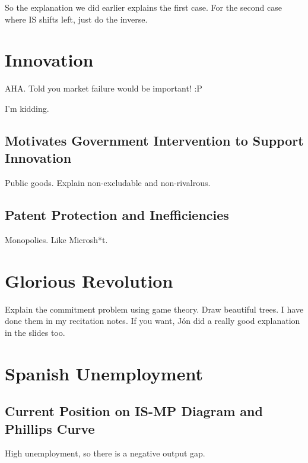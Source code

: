 \documentclass[11pt]{scrartcl}
\newcommand{\jon}{J\'{o}n }
\begin{document}
So the explanation we did earlier explains the first case. For the second case where IS shifts left, just do the inverse.

\section{Innovation}

AHA. Told you market failure would be important! :P

I'm kidding.

\subsection{Motivates Government Intervention to Support Innovation}

Public goods. Explain non-excludable and non-rivalrous.

\subsection{Patent Protection and Inefficiencies}

Monopolies. Like Microsh*t.

\section{Glorious Revolution}

Explain the commitment problem using game theory. Draw beautiful trees. I have done them in my recitation notes. If you want, \jon did a really good explanation in the slides too.

\section{Spanish Unemployment}

\subsection{Current Position on IS-MP Diagram and Phillips Curve}

High unemployment, so there is a negative output gap. 
\end{document}
